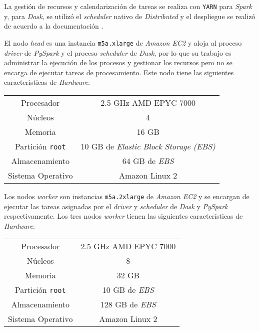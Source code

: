 La gestión de recursos y calendarización de tareas se realiza con \texttt{YARN} para \textit{Spark} y, para \textit{Dask}, se utilizó el \textit{scheduler} nativo de \textit{Distributed} y el despliegue se realizó de acuerdo a la documentación \cite{daskdistributedsetup}.

El nodo \textit{head} es una instancia \texttt{m5a.xlarge} de \textit{Amazon EC2} y aloja al proceso \textit{driver} de \textit{PySpark} y el proceso \textit{scheduler} de \textit{Dask}, por lo que su trabajo es administrar la ejecución de los procesos y gestionar los recursos pero no se encarga de ejecutar tareas de procesamiento. Este nodo tiene las siguientes características de \textit{Hardware}:

\begin{center}
\begin{tabular}{|c|c|}
 \hline
  Procesador & 2.5 GHz AMD EPYC 7000 \\ 
  Núcleos & 4 \\
  Memoria & 16 GB \\ 
  Partición \texttt{root} & 10 GB de \textit{Elastic Block Storage (EBS)}  \\
  Almacenamiento & 64 GB de \textit{EBS}  \\ 
  Sistema Operativo & Amazon Linux 2 \\
  \hline
\end{tabular}
\end{center}

Los nodos \textit{worker} son instancias \texttt{m5a.2xlarge}  de \textit{Amazon EC2} y se encargan de ejecutar las tareas asignadas por el \textit{driver} y \textit{scheduler} de \textit{Dask} y \textit{PySpark} respectivamente. Los tres nodos \textit{worker} tienen las siguientes características de \textit{Hardware}:

\begin{center}
\begin{tabular}{|c|c|}
 \hline
  Procesador & 2.5 GHz AMD EPYC 7000 \\ 
  Núcleos & 8 \\
  Memoria & 32 GB \\ 
  Partición \texttt{root} & 10 GB de \textit{EBS}  \\
  Almacenamiento & 128 GB de \textit{EBS}  \\ 
  Sistema Operativo & Amazon Linux 2 \\
  \hline
\end{tabular}
\end{center}

